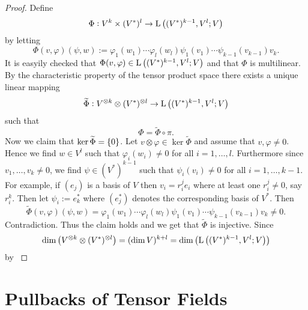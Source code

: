 \begin{proof}
Define
\begin{equation*}
\Phi : V^k \times (V^*)^l \to \Lrm\del[1]{(V^*)^{k - 1},V^l;V}
\end{equation*}
\noindent by letting
\begin{equation*}
\Phi(v,\varphi)(\psi,w) := \varphi_1(w_1) \cdots \varphi_l(w_l)\psi_1(v_1) \cdots \psi_{k-1}(v_{k-1})v_k.
\end{equation*}
It is easyily checked that $\Phi(v,\varphi) \in \Lrm\del[1]{(V^*)^{k - 1},V^l;V}$ and that $\Phi$ is multilinear. By the characteristic property of the tensor product space \cite[309]{lee:smooth_manifolds:2013} there exists a unique linear mapping 
\begin{equation*}
\widetilde{\Phi} : V^{\otimes k} \otimes (V^*)^{\otimes l} \to \Lrm\del[1]{(V^*)^{k - 1},V^l;V}
\end{equation*}
\noindent such that 
\begin{equation*}
\Phi = \widetilde{\Phi} \circ \pi.
\end{equation*}
Now we claim that $\ker\widetilde{\Phi} = \cbr{0}$. Let $v \otimes \varphi \in \ker\widetilde{\Phi}$ and assume that $v,\varphi \neq 0$. Hence we find $w \in V^l$ such that $\varphi_i(w_i) \neq 0$ for all $i = 1,\dots,l$. Furthermore since $v_1,\dots,v_k \neq 0$, we find $\psi \in (V^*)^{k-1}$ such that $\psi_i(v_i) \neq 0$ for all $i = 1,\dots,k-1$. For example, if $(e_j)$ is a basis of $V$ then $v_i = r^j_i e_i$ where at least one $r_i^j \neq 0$, say $r_i^k$. Then let $\psi_i := e^*_k$ where $(e_j^*)$ denotes the corresponding basis of $V^*$. Then
\begin{equation*}
\widetilde{\Phi}(v,\varphi)(\psi,w) = \varphi_1(w_1) \cdots \varphi_l(w_l)\psi_1(v_1) \cdots \psi_{k-1}(v_{k-1})v_k \neq 0.
\end{equation*}
Contradiction. Thus the claim holds and we get that $\widetilde{\Phi}$ is injective. Since 
\begin{equation*}
\dim \del[1]{V^{\otimes k} \otimes (V^*)^{\otimes l}} = (\dim V)^{k + l} = \dim \del[1]{\Lrm\del[1]{(V^*)^{k - 1},V^l;V}}
\end{equation*}
\noindent by \cite[309]{lee:smooth_manifolds:2013}
\end{proof}


\section{Pullbacks of Tensor Fields}

